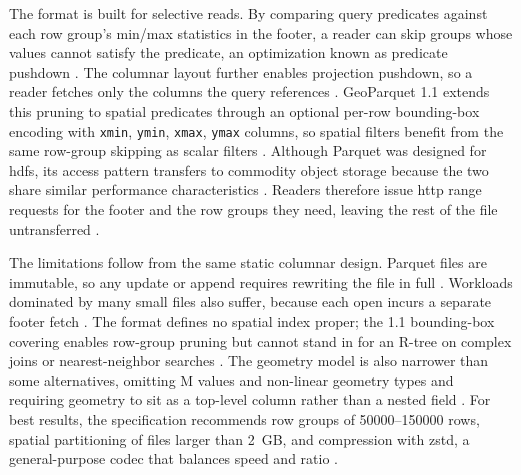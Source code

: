The format is built for selective reads. By comparing query predicates against each row group's min/max statistics in the footer, a reader can skip groups whose values cannot satisfy the predicate, an optimization known as predicate pushdown \parencite{lamb2022_querying_parquet_millisecond_latency}. The columnar layout further enables projection pushdown, so a reader fetches only the columns the query references \parencite{lamb2022_querying_parquet_millisecond_latency}. GeoParquet 1.1 extends this pruning to spatial predicates through an optional per-row bounding-box encoding with \texttt{xmin}, \texttt{ymin}, \texttt{xmax}, \texttt{ymax} columns, so spatial filters benefit from the same row-group skipping as scalar filters \parencite{ogc2024_geoparquet_specification_v110}. Although Parquet was designed for \acrfull{hdfs}, its access pattern transfers to commodity object storage because the two share similar performance characteristics \parencite{lamb2022_querying_parquet_millisecond_latency}. Readers therefore issue \acrshort{http} range requests for the footer and the row groups they need, leaving the rest of the file untransferred \parencite{cngfoundation2024_cloud_optimized_geospatial_formats_guide}.

The limitations follow from the same static columnar design. Parquet files are immutable, so any update or append requires rewriting the file in full \parencite{microsoft2024_direct_lake_parquet_immutability}. Workloads dominated by many small files also suffer, because each open incurs a separate footer fetch \parencite{cngfoundation2024_geoparquet_guide}. The format defines no spatial index proper; the 1.1 bounding-box covering enables row-group pruning but cannot stand in for an R-tree on complex joins or nearest-neighbor searches \parencite{cngfoundation2024_geoparquet_guide}. The geometry model is also narrower than some alternatives, omitting M values and non-linear geometry types and requiring geometry to sit as a top-level column rather than a nested field \parencite{ogc2024_geoparquet_specification_v110}. For best results, the specification recommends row groups of \numrange{50000}{150000} rows, spatial partitioning of files larger than \num{2}~GB, and compression with zstd, a general-purpose codec that balances speed and ratio \parencite{ogc2024_distributing_geoparquet}.

